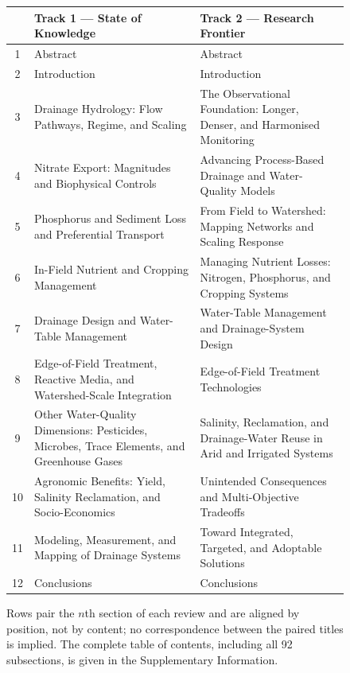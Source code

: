 \begin{figure}[t]
{\begin{minipage}{0.95\textwidth}
\begin{tabularx}{\textwidth}{@{}c>{\raggedright\arraybackslash}X>{\raggedright\arraybackslash}X@{}}
\toprule
 & {\bfseries Track 1 --- State of Knowledge} & {\bfseries Track 2 --- Research Frontier} \\
\midrule
1  & Abstract & Abstract \\
2  & Introduction & Introduction \\
3  & Drainage Hydrology: Flow Pathways, Regime, and Scaling
   & The Observational Foundation: Longer, Denser, and Harmonised Monitoring \\
4  & Nitrate Export: Magnitudes and Biophysical Controls
   & Advancing Process-Based Drainage and Water-Quality Models \\
5  & Phosphorus and Sediment Loss and Preferential Transport
   & From Field to Watershed: Mapping Networks and Scaling Response \\
6  & In-Field Nutrient and Cropping Management
   & Managing Nutrient Losses: Nitrogen, Phosphorus, and Cropping Systems \\
7  & Drainage Design and Water-Table Management
   & Water-Table Management and Drainage-System Design \\
8  & Edge-of-Field Treatment, Reactive Media, and Watershed-Scale Integration
   & Edge-of-Field Treatment Technologies \\
9  & Other Water-Quality Dimensions: Pesticides, Microbes, Trace Elements, and Greenhouse Gases
   & Salinity, Reclamation, and Drainage-Water Reuse in Arid and Irrigated Systems \\
10 & Agronomic Benefits: Yield, Salinity Reclamation, and Socio-Economics
   & Unintended Consequences and Multi-Objective Tradeoffs \\
11 & Modeling, Measurement, and Mapping of Drainage Systems
   & Toward Integrated, Targeted, and Adoptable Solutions \\
12 & Conclusions & Conclusions \\
\bottomrule
\end{tabularx}

\smallskip
{\footnotesize Rows pair the $n$th section of each review and are aligned by
position, not by content; no correspondence between the paired titles is implied.
The complete table of contents, including all 92 subsections, is given in the
Supplementary Information.}
\vspace{2pt}

\end{minipage}}
\end{figure}
